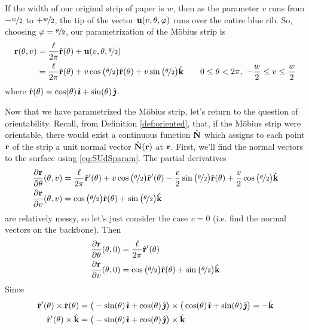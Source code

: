 \begin{eg}
If the width of our original strip of paper is $w$, then as the parameter
$v$ runs from $-\nicefrac{w}{2}$ to $+\nicefrac{w}{2}$, the tip of the
vector $\mathbf{u}(v,\theta,\varphi)$ runs over the entire blue rib. 
So, choosing $\varphi=\nicefrac{\theta}{2}$, our parametrization 
of the M\"obius strip is
\begin{align*}
\mathbf{r}(\theta,v) 
 &= \frac{\ell}{2\pi}\hat{\mathbf{r}}(\theta) 
             + \mathbf{u}(v,\theta,\nicefrac{\theta}{2}) \\
 &= \frac{\ell}{2\pi}\hat{\mathbf{r}}(\theta) 
     + v\cos\big(\nicefrac{\theta}{2}\big) \hat{\mathbf{r}}(\theta)
      + v\sin\big(\nicefrac{\theta}{2}\big) \hat{\mathbf{k}}
\qquad 0\le\theta<2\pi,\ -\frac{w}{2}\le v\le \frac{w}{2}
\end{align*}
where $\hat{\mathbf{r}}(\theta) = \cos(\theta)\,\hat{\pmb{\imath}} + \sin(\theta)\,\hat{\pmb{\jmath}}$. 

Now that we have parametrized the M\"obius strip, let's return to
the question of orientability. Recall, from Definition \ref{def:oriented},
that, if the M\"obius strip were orientable, there would exist a continuous
function $\hat{\mathbf{N}}$ which assigns to each point $\mathbf{r}$ of the strip a unit 
normal vector $\hat{\mathbf{N}}(\mathbf{r})$ at $\mathbf{r}$. First, we'll find the normal vectors
to the surface using \eqref{eq:SUdSparam}. The partial derivatives
\begin{align*}
\frac{\partial\mathbf{r}}{\partial\theta}(\theta,v)
&=\frac{\ell}{2\pi}\hat{\mathbf{r}}'(\theta) 
     + v\cos\big(\nicefrac{\theta}{2}\big) \hat{\mathbf{r}}'(\theta)
     - \frac{v}{2}\sin\big(\nicefrac{\theta}{2}\big) \hat{\mathbf{r}}(\theta)
     + \frac{v}{2}\cos\big(\nicefrac{\theta}{2}\big) \hat{\mathbf{k}}
\\
\frac{\partial\mathbf{r}}{\partial v}(\theta,v)
&=\cos\big(\nicefrac{\theta}{2}\big) \hat{\mathbf{r}}(\theta)
      + \sin\big(\nicefrac{\theta}{2}\big) \hat{\mathbf{k}}
\end{align*}
are relatively messy, so let's just consider the case $v=0$ 
(i.e. find the normal vectors on the backbone).
Then
\begin{align*}
\frac{\partial\mathbf{r}}{\partial\theta}(\theta,0)
&=\frac{\ell}{2\pi}\hat{\mathbf{r}}'(\theta) 
\\
\frac{\partial\mathbf{r}}{\partial v}(\theta,0)
&=\cos\big(\nicefrac{\theta}{2}\big) \hat{\mathbf{r}}(\theta)
      + \sin\big(\nicefrac{\theta}{2}\big) \hat{\mathbf{k}}
\end{align*}
Since
\begin{align*}
\hr'(\theta)\times \hr(\theta)
&=\big(-\sin(\theta)\,\hi + \cos(\theta)\,\hj\big)\times
   \big(\cos(\theta)\,\hi + \sin(\theta)\,\hj\big)
=-\hk
\\
\hr'(\theta)\times \hk
&=\big(-\sin(\theta)\,\hi + \cos(\theta)\,\hj\big)\times \hk

\end{align*}
\end{eg}
